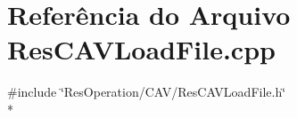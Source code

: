 \section{Referência do Arquivo Res\+C\+A\+V\+Load\+File.\+cpp}
\label{_c_a_v_2_res_c_a_v_load_file_8cpp}
{\ttfamily \#include \char`\"{}Res\+Operation/\+C\+A\+V/\+Res\+C\+A\+V\+Load\+File.\+h\char`\"{}}\\*
